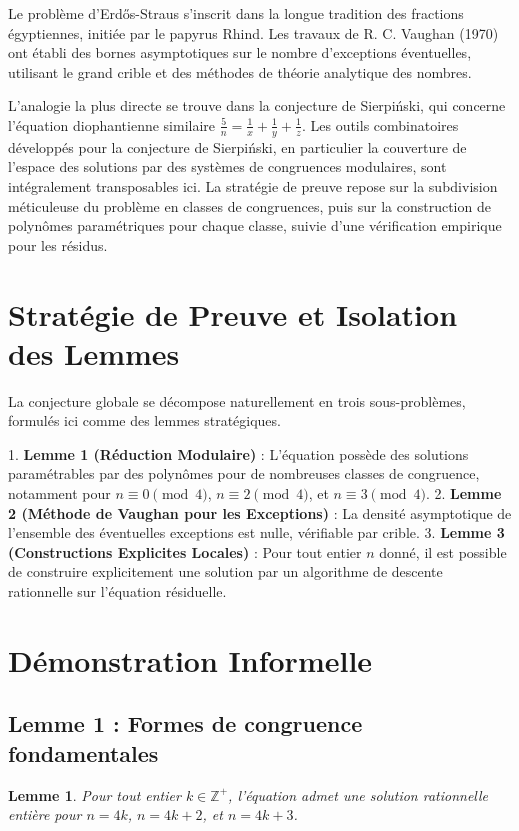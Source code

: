 \documentclass[11pt,a4paper]{article}
\newtheorem{lemma}[theorem]{Lemme}
\begin{document}
Le problème d'Erd\H{o}s-Straus s'inscrit dans la longue tradition des fractions égyptiennes, initiée par le papyrus Rhind. Les travaux de R. C. Vaughan (1970) ont établi des bornes asymptotiques sur le nombre d'exceptions éventuelles, utilisant le grand crible et des méthodes de théorie analytique des nombres.

L'analogie la plus directe se trouve dans la conjecture de Sierpi\'{n}ski, qui concerne l'équation diophantienne similaire $\frac{5}{n} = \frac{1}{x} + \frac{1}{y} + \frac{1}{z}$. Les outils combinatoires développés pour la conjecture de Sierpi\'{n}ski, en particulier la couverture de l'espace des solutions par des systèmes de congruences modulaires, sont intégralement transposables ici. La stratégie de preuve repose sur la subdivision méticuleuse du problème en classes de congruences, puis sur la construction de polynômes paramétriques pour chaque classe, suivie d'une vérification empirique pour les résidus.

\section{Stratégie de Preuve et Isolation des Lemmes}

La conjecture globale se décompose naturellement en trois sous-problèmes, formulés ici comme des lemmes stratégiques.

1.  \textbf{Lemme 1 (Réduction Modulaire)} : L'équation possède des solutions paramétrables par des polynômes pour de nombreuses classes de congruence, notamment pour $n \equiv 0 \pmod 4$, $n \equiv 2 \pmod 4$, et $n \equiv 3 \pmod 4$.
2.  \textbf{Lemme 2 (Méthode de Vaughan pour les Exceptions)} : La densité asymptotique de l'ensemble des éventuelles exceptions est nulle, vérifiable par crible.
3.  \textbf{Lemme 3 (Constructions Explicites Locales)} : Pour tout entier $n$ donné, il est possible de construire explicitement une solution par un algorithme de descente rationnelle sur l'équation résiduelle.

\section{Démonstration Informelle}

\subsection{Lemme 1 : Formes de congruence fondamentales}

\begin{lemma}
Pour tout entier $k \in \mathbb{Z}^{+}$, l'équation admet une solution rationnelle entière pour $n = 4k$, $n = 4k+2$, et $n = 4k+3$.
\end{lemma}
\end{document}
